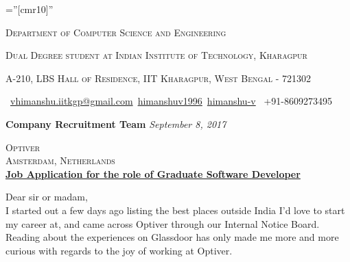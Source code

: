 \documentclass[a4paper,10pt]{extarticle} %
\begin{document}
\pagestyle{empty} %

\font\fb=''[cmr10]'' %

\par{\par} %
\par{\centering\large {\textsc{Department of Computer Science and Engineering}}\par}\large
\par{\centering\large {\textsc{Dual Degree student at Indian Institute of Technology, Kharagpur}}\par}\large
\par{\centering\large {\textsc{A-210, LBS Hall of Residence, IIT Kharagpur, West Bengal - 721302}}\par}\large
\hspace{1cm}\normalsize \faEnvelope\ {\href{mailto:vhimanshu.iitkgp@gmail.com}{vhimanshu.iitkgp@gmail.com}}\hfill \normalsize \faGithub\ {\href{https://github.com/himanshuv1996}{himanshuv1996}}\hfill \normalsize \faLinkedinSquare\ {\href{https://www.linkedin.com/in/himanshu-v}{himanshu-v}} \hfill {\faPhone\ +91-8609273495} \hspace{1cm}\vspace{10pt}

\textbf{\large{Company Recruitment Team}} \hfill \textit{September 8, 2017}

\textsc{Optiver} \\
\textsc{Amsterdam, Netherlands}\\

\underline{\textbf{Job Application for the role of Graduate Software Developer}}

Dear sir or madam,\\

I started out a few days ago listing the best places outside India I'd love to start my career at, and came across Optiver through our Internal Notice Board. Reading about the experiences on Glassdoor has only made me more and more curious with regards to the joy of working at Optiver.\\ 
\end{document}
